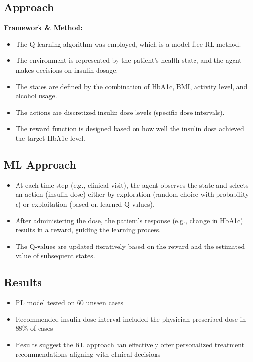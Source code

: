 \subsection*{Approach}
\textbf{Framework \& Method:}
\begin{itemize}
    \item The Q-learning algorithm was employed, which is a model-free RL method.
    \item The environment is represented by the patient’s health state, and the agent makes decisions on insulin dosage.
    \item The states are defined by the combination of HbA1c, BMI, activity level, and alcohol usage.
    \item The actions are discretized insulin dose levels (specific dose intervals).
    \item The reward function is designed based on how well the insulin dose achieved the target HbA1c level.
\end{itemize}

\subsection*{ML Approach}
\begin{itemize}
    \item At each time step (e.g., clinical visit), the agent observes the state and selects an action (insulin dose) either by exploration (random choice with probability $\epsilon$) or exploitation (based on learned Q-values).
    \item After administering the dose, the patient's response (e.g., change in HbA1c) results in a reward, guiding the learning process.
    \item The Q-values are updated iteratively based on the reward and the estimated value of subsequent states.
\end{itemize}

\subsection*{Results}
\begin{itemize}
    \item RL model tested on 60 unseen cases
    \item Recommended insulin dose interval included the physician-prescribed dose in 88\% of cases
    \item Results suggest the RL approach can effectively offer personalized treatment recommendations aligning with clinical decisions
\end{itemize}

